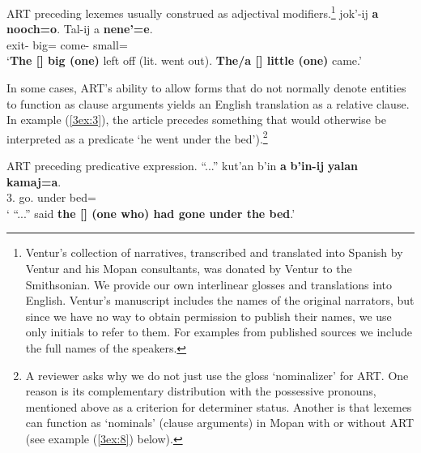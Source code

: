 \documentclass[output=paper]{langsci/langscibook}
\begin{document}
\begin{exe}
\ex\label{3ex:2}
ART preceding lexemes usually construed as adjectival modifiers.\footnote{{Ventur's collection of narratives, transcribed and translated into Spanish by Ventur and his Mopan consultants, was donated by Ventur to the Smithsonian. We provide our own interlinear glosses and translations into English. Ventur's manuscript includes the names of the original narrators, but since we have no way to obtain permission to publish their names, we use only initials to refer to them. For examples from published sources we include the full names of the speakers.}}
\exi{}
\gll 	jok'-ij				{\bf{a}}	{\bf{nooch=o}}.	Tal-ij					a		{\bf{nene'=e}}. \\
	exit-{}	{}	big={}	come-{}	{}	small={} \\
\glt	`{{\bf{The [{}] big (one)}} left off (lit. went out).  {\bf{The/a [{}] little (one)}} came.}'
\end{exe}

\newpage
In some cases, ART's ability to allow forms that do not normally denote entities to function as clause arguments yields an English translation as a relative clause. In example (\ref{3ex:3}), the article precedes something that would otherwise be interpreted as a predicate `he went under the bed').\footnote{A reviewer asks why we do not just use the gloss `nominalizer' for ART. One reason is its complementary distribution with the possessive pronouns, mentioned above as a criterion for determiner status. Another is that lexemes can function as `nominals' (clause arguments) in Mopan with or without ART (see example (\ref{3ex:8}) below).}

\begin{exe}
\ex\label{3ex:3}
ART preceding predicative expression. 
\exi{}
\gll	``...''	kut'an		b'in		{\bf{a}}	{\bf{b'in-ij}} 			{\bf{yalan}}	{\bf{kamaj=a}}.\\
	{}	3.{}	{}	{}	go.{} 	under		bed={}\\
\glt	` ``...'' said {\bf{the [{}] (one who) had gone under the bed}}.'
\end{exe}
\end{document}
